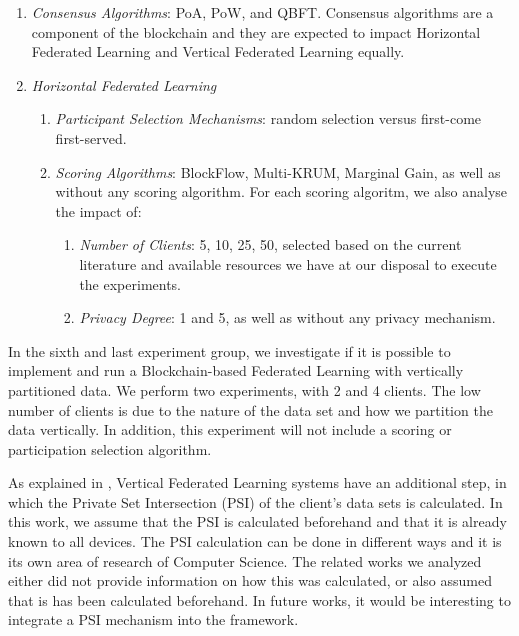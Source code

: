 \begin{enumerate}
    \item \textit{Consensus Algorithms}: PoA, PoW, and QBFT. Consensus algorithms are a component of the blockchain and they are expected to impact Horizontal Federated Learning and Vertical Federated Learning equally.
    
    \item \textit{Horizontal Federated Learning}
    
    \begin{enumerate}
        \item \textit{Participant Selection Mechanisms}: random selection versus first-come first-served.
        
        \item \textit{Scoring Algorithms}: BlockFlow, Multi-KRUM, Marginal Gain, as well as without any scoring algorithm. For each scoring algoritm, we also analyse the impact of:
        
        \begin{enumerate}
            \item \textit{Number of Clients}: 5, 10, 25, 50, selected based on the current literature and available resources we have at our disposal to execute the experiments.
            
            \item \textit{Privacy Degree}: 1 and 5, as well as without any privacy mechanism.
        \end{enumerate}
    \end{enumerate}
\end{enumerate}

In the sixth and last experiment group, we investigate if it is possible to implement and run a Blockchain-based Federated Learning with vertically partitioned data. We perform two experiments, with 2 and 4 clients. The low number of clients is due to the nature of the data set and how we partition the data vertically. In addition, this experiment will not include a scoring or participation selection algorithm.

As explained in , Vertical Federated Learning systems have an additional step, in which the Private Set Intersection (PSI) of the client's data sets is calculated. In this work, we assume that the PSI is calculated beforehand and that it is already known to all devices. The PSI calculation can be done in different ways and it is its own area of research of Computer Science. The related works we analyzed either did not provide information on how this was calculated, or also assumed that is has been calculated beforehand. In future works, it would be interesting to integrate a PSI mechanism into the framework.

